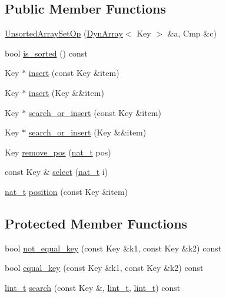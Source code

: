 \subsection*{Public Member Functions}
\begin{DoxyCompactItemize}
\item 
\hyperlink{class_designar_1_1_unsorted_array_set_op_a3f01d03aaf449273fd884809764cf841}{Unsorted\+Array\+Set\+Op} (\hyperlink{class_designar_1_1_dyn_array}{Dyn\+Array}$<$ Key $>$ \&a, Cmp \&c)
\item 
bool \hyperlink{class_designar_1_1_unsorted_array_set_op_afc0e1e303afc39e67727d985a0eb122e}{is\+\_\+sorted} () const
\item 
Key $\ast$ \hyperlink{class_designar_1_1_unsorted_array_set_op_a7e205053bbcef407bdbde7dae628b2a7}{insert} (const Key \&item)
\item 
Key $\ast$ \hyperlink{class_designar_1_1_unsorted_array_set_op_aaab3531e6bd3e3044560f3645ce2c529}{insert} (Key \&\&item)
\item 
Key $\ast$ \hyperlink{class_designar_1_1_unsorted_array_set_op_a620fa45eb4c7ec033569321ecdb2eace}{search\+\_\+or\+\_\+insert} (const Key \&item)
\item 
Key $\ast$ \hyperlink{class_designar_1_1_unsorted_array_set_op_afbef93edb33f4767a16f27affaefcee3}{search\+\_\+or\+\_\+insert} (Key \&\&item)
\item 
Key \hyperlink{class_designar_1_1_unsorted_array_set_op_aced2517a0e708effb820f5591369a7c1}{remove\+\_\+pos} (\hyperlink{namespace_designar_aa72662848b9f4815e7bf31a7cf3e33d1}{nat\+\_\+t} pos)
\item 
const Key \& \hyperlink{class_designar_1_1_unsorted_array_set_op_aa73bc195688fed065a7cdd6b3f06a02e}{select} (\hyperlink{namespace_designar_aa72662848b9f4815e7bf31a7cf3e33d1}{nat\+\_\+t} i)
\item 
\hyperlink{namespace_designar_aa72662848b9f4815e7bf31a7cf3e33d1}{nat\+\_\+t} \hyperlink{class_designar_1_1_unsorted_array_set_op_ab2f0ef08a3d92669f793727d51de705e}{position} (const Key \&item)
\end{DoxyCompactItemize}
\subsection*{Protected Member Functions}
\begin{DoxyCompactItemize}
\item 
bool \hyperlink{class_designar_1_1_unsorted_array_set_op_aed07acdf2c6e94cbe1392e78f9484c2a}{not\+\_\+equal\+\_\+key} (const Key \&k1, const Key \&k2) const
\item 
bool \hyperlink{class_designar_1_1_unsorted_array_set_op_adaba74cc7cc8541af17b7324b9ac3eb4}{equal\+\_\+key} (const Key \&k1, const Key \&k2) const
\item 
\hyperlink{namespace_designar_a9d113d66a39e82b73727c72cd3a52f73}{lint\+\_\+t} \hyperlink{class_designar_1_1_unsorted_array_set_op_ac53cf73a36b29889fecf4bf06196e561}{search} (const Key \&, \hyperlink{namespace_designar_a9d113d66a39e82b73727c72cd3a52f73}{lint\+\_\+t}, \hyperlink{namespace_designar_a9d113d66a39e82b73727c72cd3a52f73}{lint\+\_\+t}) const
\end{DoxyCompactItemize}


